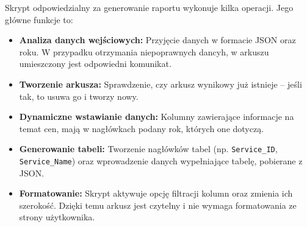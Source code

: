Skrypt odpowiedzialny za generowanie raportu wykonuje kilka operacji. Jego główne funkcje to:
\begin{itemize}
    \item \textbf{Analiza danych wejściowych:} Przyjęcie danych w formacie JSON oraz roku. W przypadku otrzymania niepoprawnych dancyh, w arkuszu umieszczony jest odpowiedni komunikat.
    \item \textbf{Tworzenie arkusza:} Sprawdzenie, czy arkusz wynikowy już istnieje -- jeśli tak, to usuwa go i tworzy nowy.
    \item \textbf{Dynamiczne wstawianie danych:} Kolumny zawierające informacje na temat cen, mają w nagłówkach podany rok, których one dotyczą.
    \item \textbf{Generowanie tabeli:} Tworzenie nagłówków tabel (np. \texttt{Service\_ID}, \texttt{Service\_Name}) oraz wprowadzenie danych wypełniające tabelę, pobierane z JSON.
    \item \textbf{Formatowanie:} Skrypt aktywuje opcję filtracji kolumn oraz zmienia ich szerokość. Dzięki temu arkusz jest czytelny i nie wymaga formatowania ze strony użytkownika.
\end{itemize}




